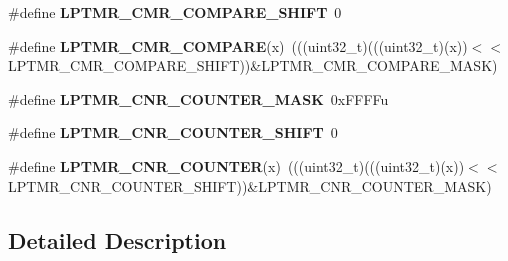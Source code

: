 \begin{DoxyCompactItemize}
\item 
\#define {\bfseries L\+P\+T\+M\+R\+\_\+\+C\+M\+R\+\_\+\+C\+O\+M\+P\+A\+R\+E\+\_\+\+S\+H\+I\+FT}~0\hypertarget{group__LPTMR__Register__Masks_gae1a525e22dc8b9c6960ae2e859a64232}{}\label{group__LPTMR__Register__Masks_gae1a525e22dc8b9c6960ae2e859a64232}

\item 
\#define {\bfseries L\+P\+T\+M\+R\+\_\+\+C\+M\+R\+\_\+\+C\+O\+M\+P\+A\+RE}(x)~(((uint32\+\_\+t)(((uint32\+\_\+t)(x))$<$$<$L\+P\+T\+M\+R\+\_\+\+C\+M\+R\+\_\+\+C\+O\+M\+P\+A\+R\+E\+\_\+\+S\+H\+I\+FT))\&L\+P\+T\+M\+R\+\_\+\+C\+M\+R\+\_\+\+C\+O\+M\+P\+A\+R\+E\+\_\+\+M\+A\+SK)\hypertarget{group__LPTMR__Register__Masks_gad61ee0ea43ca3e503c2c16ed1b7b1696}{}\label{group__LPTMR__Register__Masks_gad61ee0ea43ca3e503c2c16ed1b7b1696}

\item 
\#define {\bfseries L\+P\+T\+M\+R\+\_\+\+C\+N\+R\+\_\+\+C\+O\+U\+N\+T\+E\+R\+\_\+\+M\+A\+SK}~0x\+F\+F\+F\+Fu\hypertarget{group__LPTMR__Register__Masks_ga134708aff0fe3bd31d703e32966c08fc}{}\label{group__LPTMR__Register__Masks_ga134708aff0fe3bd31d703e32966c08fc}

\item 
\#define {\bfseries L\+P\+T\+M\+R\+\_\+\+C\+N\+R\+\_\+\+C\+O\+U\+N\+T\+E\+R\+\_\+\+S\+H\+I\+FT}~0\hypertarget{group__LPTMR__Register__Masks_ga3769a974a3d95250e32bb154fa134c3f}{}\label{group__LPTMR__Register__Masks_ga3769a974a3d95250e32bb154fa134c3f}

\item 
\#define {\bfseries L\+P\+T\+M\+R\+\_\+\+C\+N\+R\+\_\+\+C\+O\+U\+N\+T\+ER}(x)~(((uint32\+\_\+t)(((uint32\+\_\+t)(x))$<$$<$L\+P\+T\+M\+R\+\_\+\+C\+N\+R\+\_\+\+C\+O\+U\+N\+T\+E\+R\+\_\+\+S\+H\+I\+FT))\&L\+P\+T\+M\+R\+\_\+\+C\+N\+R\+\_\+\+C\+O\+U\+N\+T\+E\+R\+\_\+\+M\+A\+SK)\hypertarget{group__LPTMR__Register__Masks_ga8732990b7f3af802120a5e95000c963f}{}\label{group__LPTMR__Register__Masks_ga8732990b7f3af802120a5e95000c963f}

\end{DoxyCompactItemize}


\subsection{Detailed Description}
